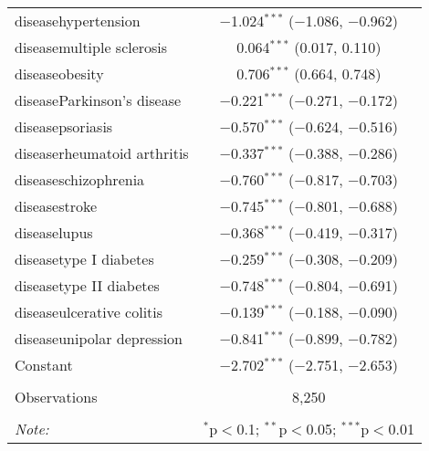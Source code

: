 \begin{table}[!htbp]
\begin{tabular}{@{\extracolsep{5pt}}lc}
  diseasehypertension & $-$1.024$^{***}$ ($-$1.086, $-$0.962) \\ 
  diseasemultiple sclerosis & 0.064$^{***}$ (0.017, 0.110) \\ 
  diseaseobesity & 0.706$^{***}$ (0.664, 0.748) \\ 
  diseaseParkinson's disease & $-$0.221$^{***}$ ($-$0.271, $-$0.172) \\ 
  diseasepsoriasis & $-$0.570$^{***}$ ($-$0.624, $-$0.516) \\ 
  diseaserheumatoid arthritis & $-$0.337$^{***}$ ($-$0.388, $-$0.286) \\ 
  diseaseschizophrenia & $-$0.760$^{***}$ ($-$0.817, $-$0.703) \\ 
  diseasestroke & $-$0.745$^{***}$ ($-$0.801, $-$0.688) \\ 
  diseaselupus & $-$0.368$^{***}$ ($-$0.419, $-$0.317) \\ 
  diseasetype I diabetes & $-$0.259$^{***}$ ($-$0.308, $-$0.209) \\ 
  diseasetype II diabetes & $-$0.748$^{***}$ ($-$0.804, $-$0.691) \\ 
  diseaseulcerative colitis & $-$0.139$^{***}$ ($-$0.188, $-$0.090) \\ 
  diseaseunipolar depression & $-$0.841$^{***}$ ($-$0.899, $-$0.782) \\ 
  Constant & $-$2.702$^{***}$ ($-$2.751, $-$2.653) \\ 
 \hline \\[-1.8ex] 
Observations & 8,250 \\ 
\hline 
\hline \\[-1.8ex] 
\textit{Note:}  & \multicolumn{1}{r}{$^{*}$p$<$0.1; $^{**}$p$<$0.05; $^{***}$p$<$0.01} \\ 
\end{tabular} 
\end{table} 

